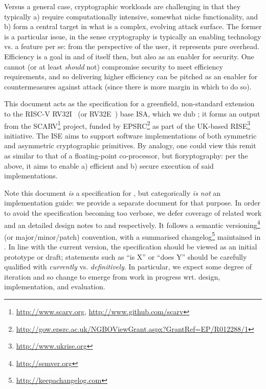 
Versus a general case, cryptographic workloads are challenging in that they
typically
a) require computationally intensive, somewhat niche functionality,
   and
b) form a central target in what is a complex, evolving attack surface.
The former is a particular issue, in the sense cryptography is typically an
enabling technology vs. a feature per se: from the perspective of the user,
it represents pure overhead.  Efficiency is a goal in and of itself then, 
but also as an enabler for security.  One cannot (or at least {\em should} 
not) compromise security to meet efficiency requirements, and so delivering
higher efficiency can be pitched as an enabler for countermeasures against 
attack (since there is more margin in which to do so).

This document acts as the specification for a 
greenfield, non-standard extension~\cite[Section 21.1]{SCARV:RV:ISA:I:17} 
to the RISC-V 
RV32I~\cite[Section 2]{SCARV:RV:ISA:I:17} (or RV32E~\cite[Section 3]{SCARV:RV:ISA:I:17})
base ISA, which we dub \XCID; it forms an output from the SCARV\footnote{
\url{http://www.scarv.org}, \url{http://www.github.com/scarv}
} project, funded by EPSRC\footnote{
\url{http://gow.epsrc.ac.uk/NGBOViewGrant.aspx?GrantRef=EP/R012288/1}
} as part of the UK-based RISE\footnote{
\url{http://www.ukrise.org}
} initiative.
The \XCID ISE aims to support software implementations of both symmetric and 
asymmetric cryptographic primitives.  By analogy, one could view this remit
as similar to that of a floating-point co-processor, but fioryptography: 
per the above, it aims to enable
a) efficient
   and
b) secure
execution of said implementations.

Note this document {\em is} a specification for \XCID, but categorically
{\em is not} an implementation guide: we provide a separate document for 
that purpose.  In order to avoid the specification becoming too verbose,
we defer coverage of related work and an detailed design notes to
and
respectively.  It follows a semantic versioning\footnote{
\url{http://semver.org}
} (or major/minor/patch) convention, with a summarised changelog\footnote{
\url{http://keepachangelog.com}
} maintained in
.
In line with the current version, the specification should be viewed as an
initial prototype or draft; statements such as 
``\XCID is   X'' 
or
``\XCID does Y''
should be carefully qualified with {\em currently} vs. {\em definitively}.  
In particular, we expect some degree of iteration and so change to emerge 
from work in progress wrt. design, implementation, and evaluation.

